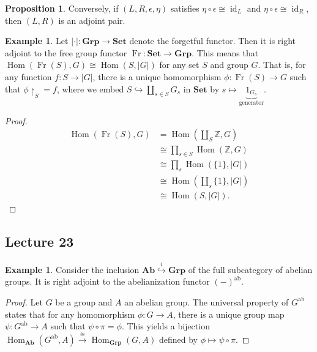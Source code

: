 \documentclass[10pt,letterpaper,cm]{nupset}
\theoremstyle{definition}
\newtheorem{exmp}[definition]{Example}
\theoremstyle{theorem}
\newtheorem{prop}[definition]{Proposition}
\theoremstyle{remark}
\newcommand{\Z}{\mathbb Z}
\newcommand{\1}{\mathbf{1}}
\newcommand{\0}{\vec 0}
\DeclareMathOperator{\id}{\mathrm{id}}
\DeclareMathOperator{\ab}{ab}
\DeclareMathOperator{\Hom}{Hom}
\DeclareMathOperator{\Fr}{Fr}
\begin{document}
\begin{prop}
Conversely, if $\left(L, R, \epsilon, \eta\right)$ satisfies $\eta \circ \epsilon \cong \id_L$ and $\eta \circ \epsilon \cong \id_R$, then $\left(L, R\right)$ is an adjoint pair.
\end{prop}

\begin{exmp}
 Let $\lvert{\cdot}\rvert : \mathbf{Grp} \to \mathbf{Set}$ denote the forgetful functor. Then it is right adjoint to the free group functor $\Fr : \mathbf{Set} \to \mathbf{Grp}$. This means that $\Hom(\Fr(S), G) \cong \Hom(S, \lvert{G}\rvert)$ for any set $S$ and group $G$. That is, for any function $f: S \to \lvert{G}\rvert$, there is a unique homomorphism $\phi : \Fr(S) \to G$ such that $\phi \restriction_S = f$, where we embed $S \hookrightarrow \coprod_{s\in S} G_s$ in $\mathbf{Set}$ by $s\mapsto \underbrace{1_{G_s}}_{\text{generator}}$.
 \end{exmp}
\begin{proof}
\begin{align*}
 \Hom(\Fr(S), G) & = \Hom\left(\coprod_S \Z, G\right) 
 \\ & \cong  \prod_{s\in S} \Hom(\Z, G) 
 \\ & \cong \prod_s \Hom\left(\{1\}, \lvert{G}\rvert\right)
 \\ &  \cong \Hom\left(\coprod_s \{1\}, \lvert{G}\rvert\right) 
 \\ & \cong  \Hom\left(S, \lvert{G}\rvert\right).
 \end{align*}
\end{proof}

\subsection{Lecture 23}

\begin{exmp}  Consider the inclusion  $\mathbf{Ab} \overset{i}{\hookrightarrow} \mathbf{Grp}$ of the full subcategory of abelian groups. It is right adjoint to the abelianization functor $(-)^{\ab}$.
\end{exmp}
\begin{proof}
Let $G$ be a group and $A$ an abelian group. The universal property of $G^{\ab}$ states that for any homomorphism $\phi : G \to A$, there is a unique group map $\psi : G^{\ab} \to A$ such that $ \psi \circ \pi = \phi$. This yields a bijection $\Hom_{\mathbf{Ab}}(G^{\ab}, A) \overset{\cong}{\longrightarrow} \Hom_{\mathbf{Grp}}(G, A)$ defined by $\phi \mapsto \psi \circ \pi$.
\end{proof}
\end{document}

